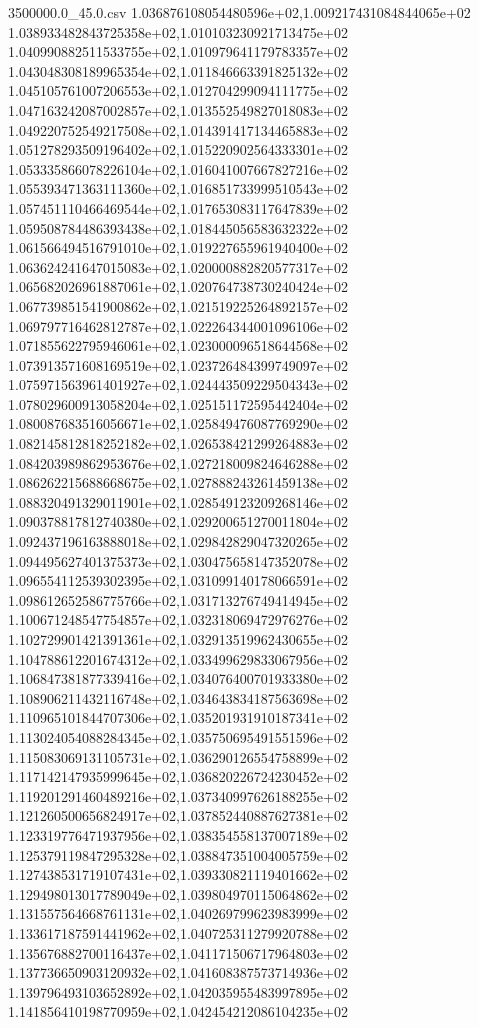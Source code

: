 \begin{filecontents*}{3500000.0_45.0.csv}
1.036876108054480596e+02,1.009217431084844065e+02
1.038933482843725358e+02,1.010103230921713475e+02
1.040990882511533755e+02,1.010979641179783357e+02
1.043048308189965354e+02,1.011846663391825132e+02
1.045105761007206553e+02,1.012704299094111775e+02
1.047163242087002857e+02,1.013552549827018083e+02
1.049220752549217508e+02,1.014391417134465883e+02
1.051278293509196402e+02,1.015220902564333301e+02
1.053335866078226104e+02,1.016041007667827216e+02
1.055393471363111360e+02,1.016851733999510543e+02
1.057451110466469544e+02,1.017653083117647839e+02
1.059508784486393438e+02,1.018445056583632322e+02
1.061566494516791010e+02,1.019227655961940400e+02
1.063624241647015083e+02,1.020000882820577317e+02
1.065682026961887061e+02,1.020764738730240424e+02
1.067739851541900862e+02,1.021519225264892157e+02
1.069797716462812787e+02,1.022264344001096106e+02
1.071855622795946061e+02,1.023000096518644568e+02
1.073913571608169519e+02,1.023726484399749097e+02
1.075971563961401927e+02,1.024443509229504343e+02
1.078029600913058204e+02,1.025151172595442404e+02
1.080087683516056671e+02,1.025849476087769290e+02
1.082145812818252182e+02,1.026538421299264883e+02
1.084203989862953676e+02,1.027218009824646288e+02
1.086262215688668675e+02,1.027888243261459138e+02
1.088320491329011901e+02,1.028549123209268146e+02
1.090378817812740380e+02,1.029200651270011804e+02
1.092437196163888018e+02,1.029842829047320265e+02
1.094495627401375373e+02,1.030475658147352078e+02
1.096554112539302395e+02,1.031099140178066591e+02
1.098612652586775766e+02,1.031713276749414945e+02
1.100671248547754857e+02,1.032318069472976276e+02
1.102729901421391361e+02,1.032913519962430655e+02
1.104788612201674312e+02,1.033499629833067956e+02
1.106847381877339416e+02,1.034076400701933380e+02
1.108906211432116748e+02,1.034643834187563698e+02
1.110965101844707306e+02,1.035201931910187341e+02
1.113024054088284345e+02,1.035750695491551596e+02
1.115083069131105731e+02,1.036290126554758899e+02
1.117142147935999645e+02,1.036820226724230452e+02
1.119201291460489216e+02,1.037340997626188255e+02
1.121260500656824917e+02,1.037852440887627381e+02
1.123319776471937956e+02,1.038354558137007189e+02
1.125379119847295328e+02,1.038847351004005759e+02
1.127438531719107431e+02,1.039330821119401662e+02
1.129498013017789049e+02,1.039804970115064862e+02
1.131557564668761131e+02,1.040269799623983999e+02
1.133617187591441962e+02,1.040725311279920788e+02
1.135676882700116437e+02,1.041171506717964803e+02
1.137736650903120932e+02,1.041608387573714936e+02
1.139796493103652892e+02,1.042035955483997895e+02
1.141856410198770959e+02,1.042454212086104235e+02

\end{filecontents*}
